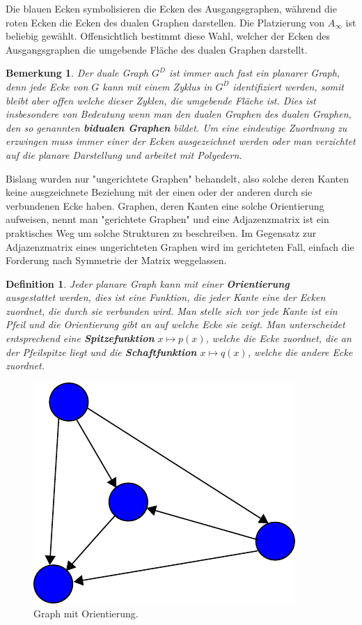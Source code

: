 \documentclass[11pt,a4paper,leqno]{report}
\newtheorem{definition}[theorem]{Definition}
\newtheorem{remark}[theorem]{Bemerkung}
\numberwithin{equation}{chapter}
\begin{document}
\noindent
Die blauen Ecken symbolisieren die Ecken des Ausgangsgraphen, während die roten Ecken die Ecken des dualen Graphen darstellen. Die Platzierung von $A_\infty$ ist beliebig gew\"ahlt. Offensichtlich bestimmt diese Wahl, welcher der Ecken des Ausgangsgraphen die umgebende Fl\"ache des dualen Graphen darstellt.
\begin{remark}
	Der duale Graph $G^D$ ist immer auch fast ein planarer Graph, denn jede Ecke von $G$ kann mit einem Zyklus in $G^D$ identifiziert werden, somit bleibt aber offen welche dieser Zyklen, die umgebende Fl\"ache ist. Dies ist insbesondere von Bedeutung wenn man den dualen Graphen des dualen Graphen, den so genannten \textbf{bidualen Graphen} bildet. Um eine eindeutige Zuordnung zu erzwingen muss immer einer der Ecken ausgezeichnet werden oder man verzichtet auf die planare Darstellung und arbeitet mit Polyedern. 
\end{remark}
\noindent
Bislang wurden nur "ungerichtete Graphen" behandelt, also solche deren Kanten keine ausgzeichnete Beziehung mit der einen oder der anderen durch sie verbundenen Ecke haben. Graphen, deren Kanten eine solche Orientierung aufweisen, nennt man "gerichtete Graphen" und eine Adjazenzmatrix ist ein praktisches Weg um solche Strukturen zu beschreiben. Im Gegensatz zur Adjazenzmatrix eines ungerichteten Graphen wird im gerichteten Fall, einfach die Forderung nach Symmetrie der Matrix weggelassen.
\begin{definition}
	Jeder planare Graph kann mit einer \textbf{Orientierung} \\ausgestattet werden, dies ist eine Funktion, die jeder Kante eine der Ecken zuordnet, die durch sie verbunden wird. Man stelle sich vor jede Kante ist ein Pfeil und die Orientierung gibt an auf welche Ecke sie zeigt. Man unterscheidet entsprechend eine \textbf{Spitzefunktion} $x\mapsto p(x)$, welche die Ecke zuordnet, die an der Pfeilspitze liegt und die \textbf{Schaftfunktion} $x\mapsto q(x)$, welche die andere Ecke zuordnet.
\end{definition}
\begin{figure}[H]
	\begin{center}
		\includegraphics[scale=0.4]{Abbildungen/graph_1_orient.pdf}
		\caption{Graph mit Orientierung.}
	\end{center}
\end{figure}
\end{document}
